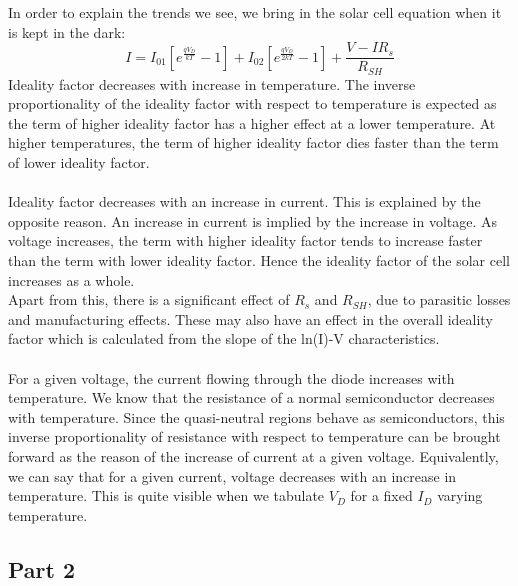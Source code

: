 \documentclass[12pt]{article}
\begin{document}
In order to explain the trends we see, we bring in the solar cell equation when it is kept in the dark:
\[ I = I_{01}\left[ e^{\frac{qV_D}{kT}} - 1\right] + I_{02}\left[ e^{\frac{qV_D}{2kT}} - 1\right] + \frac{V-IR_s}{R_{SH}}\]
Ideality factor decreases with increase in temperature. The inverse proportionality of the ideality factor with respect to temperature is expected as the term of higher ideality factor has a higher effect at a lower temperature. At higher temperatures, the term of higher ideality factor dies faster than the term of lower ideality factor.\\\\
Ideality factor decreases with an increase in current. This is explained by the opposite reason. An increase in current is implied by the increase in voltage. As voltage increases, the term with higher ideality factor tends to increase faster than the term with lower ideality factor. Hence the ideality factor of the solar cell increases as a whole.\\
Apart from this, there is a significant effect of \( R_s \) and \( R_{SH} \), due to parasitic losses and manufacturing effects. These may also have an effect in the overall ideality factor which is calculated from the slope of the ln(I)-V characteristics.\\\\
For a given voltage, the current flowing through the diode increases with temperature. We know that the resistance of a normal semiconductor decreases with temperature. Since the quasi-neutral regions behave as semiconductors, this inverse proportionality of resistance with respect to temperature can be brought forward as the reason of the increase of current at a given voltage. Equivalently, we can say that for a given current, voltage decreases with an increase in temperature. This is quite visible when we tabulate \( V_D \) for a fixed \( I_D \) varying temperature.

\subsection{Part 2}
\end{document}
